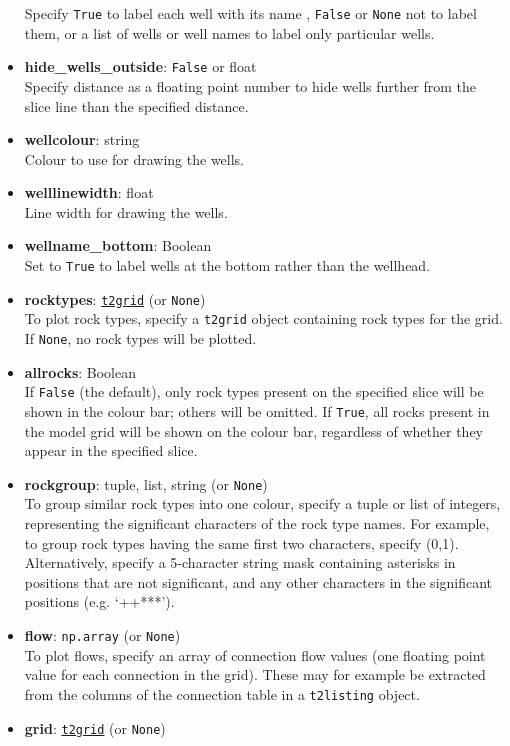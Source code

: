 \begin{itemize}
  Specify \texttt{True} to label each well with its name , \texttt{False} or \texttt{None} not to label them, or a list of wells or well names to label only particular wells.
\item \textbf{hide\_wells\_outside}: \texttt{False} or float\\
  Specify distance as a floating point number to hide wells further from the slice line than the specified distance.
\item \textbf{wellcolour}: string\\
  Colour to use for drawing the wells.
\item \textbf{welllinewidth}: float\\
  Line width for drawing the wells.
\item \textbf{wellname\_bottom}: Boolean\\
  Set to \texttt{True} to label wells at the bottom rather than the wellhead.
\item \textbf{rocktypes}: \hyperref[t2grids]{\texttt{t2grid}} (or \texttt{None})\\
  To plot rock types, specify a \texttt{t2grid} object containing rock types for the grid.  If \texttt{None}, no rock types will be plotted.
\item \textbf{allrocks}: Boolean\\
  If \texttt{False} (the default), only rock types present on the specified slice will be shown in the colour bar; others will be omitted.  If \texttt{True}, all rocks present in the model grid will be shown on the colour bar, regardless of whether they appear in the specified slice.
\item \textbf{rockgroup}: tuple, list, string (or \texttt{None})\\
  To group similar rock types into one colour, specify a tuple or list of integers, representing the significant characters of the rock type names.  For example, to group rock types having the same first two characters, specify (0,1).  Alternatively, specify a 5-character string mask containing asterisks in positions that are not significant, and any other characters in the significant positions (e.g. `++***').
\item \textbf{flow}: \texttt{np.array} (or \texttt{None})\\
  To plot flows, specify an array of connection flow values (one floating point value for each connection in the grid).  These may for example be extracted from the columns of the connection table in a \texttt{t2listing} object.
\item \textbf{grid}: \hyperref[t2grids]{\texttt{t2grid}} (or \texttt{None})\\

\end{itemize}
